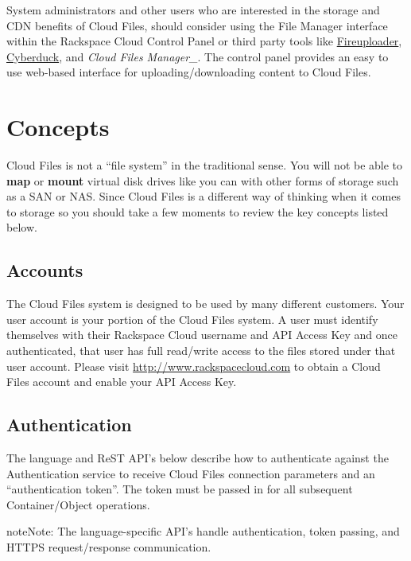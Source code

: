 \documentclass[letterpaper,10pt,english]{manual}
\begin{document}
System administrators and other users who are interested in the storage
and CDN benefits of Cloud Files, should consider using the File Manager
interface within the Rackspace Cloud Control Panel or third party tools
like \href{http://www.fireuploader.com/}{Fireuploader}, \href{http://www.cyberduck.ch/}{Cyberduck}, and \emph{Cloud Files Manager\_}.  The control
panel provides an easy to use web-based interface for uploading/downloading
content to Cloud Files.


\chapter{Concepts}

Cloud Files is not a “file system” in the traditional sense. You will not
be able to \textbf{map} or \textbf{mount} virtual disk drives like you can with
other forms of storage such as a SAN or NAS. Since Cloud Files is a
different way of thinking when it comes to storage so you should take a
few moments to review the key concepts listed below.


\section{Accounts}

The Cloud Files system is designed to be used by many different customers.
Your user account is your portion of the Cloud Files system. A user must
identify themselves with their Rackspace Cloud username and API Access Key
and once authenticated, that user has full read/write access to the files
stored under that user account. Please visit \href{http://www.rackspacecloud.com}{http://www.rackspacecloud.com}
to obtain a Cloud Files account and enable your API Access Key.


\section{Authentication}

The language and ReST API's below describe how to authenticate against the
Authentication service to receive Cloud Files connection parameters and an
“authentication token”.  The token must be passed in for all subsequent
Container/Object operations.

\begin{notice}{note}{Note:}
The language-specific API's handle authentication, token passing,
and HTTPS request/response communication.
\end{notice}
\end{document}
